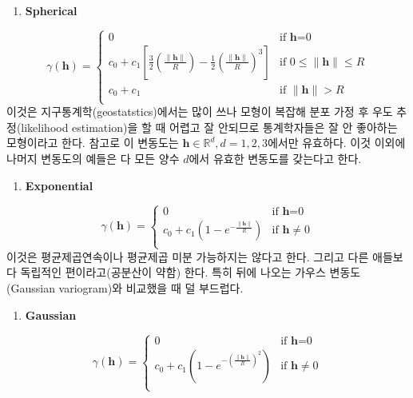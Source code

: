 \documentclass[b5paper,]{scrbook}
\providecommand{\tightlist}{%
  \setlength{\itemsep}{0pt}\setlength{\parskip}{0pt}}
\theoremstyle{plain}
\theoremstyle{definition}
\numberwithin{equation}{section}
\begin{document}
\begin{enumerate}
\def\labelenumi{\arabic{enumi}.}
\setcounter{enumi}{1}
\tightlist
\item
  \textbf{Spherical}
\end{enumerate}

\[
\gamma(\mathbf{h})= \left\{ \begin{array}{ll}
0 & \textrm{if $\mathbf{h}$=0}\\
c_{0}+c_{1}[\frac{3}{2}(\frac{\| \mathbf{h}\|}{R})-\frac{1}{2}(\frac{\| \mathbf{h}\|}{R})^{3}] & \textrm{if $0 \leq \|\mathbf{h}\|\leq R$}\\
c_{0}+c_{1} & \textrm{if $\|\mathbf{h}\|>R$}\\
\end{array} \right.
\] 이것은 지구통계학(geostatstics)에서는 많이 쓰나 모형이 복잡해 분포
가정 후 우도 추정(likelihood estimation)을 할 때 어렵고 잘 안되므로
통계학자들은 잘 안 좋아하는 모형이라고 한다. 참고로 이 변동도는
\(\mathbf{h} \in \mathbb{R}^{d}, d=1,2,3\)에서만 유효하다. 이것 이외에
나머지 변동도의 예들은 다 모든 양수 \(d\)에서 유효한 변동도를 갖는다고
한다.

\begin{enumerate}
\def\labelenumi{\arabic{enumi}.}
\setcounter{enumi}{2}
\tightlist
\item
  \textbf{Exponential}
\end{enumerate}

\[
\gamma(\mathbf{h})= \left\{ \begin{array}{ll}
0 & \textrm{if $\mathbf{h}$=0}\\
c_{0}+c_{1}(1-e^{-\frac{\|\mathbf{h}\|}{R}}) & \textrm{if $\mathbf{h}\neq 0$}\\
\end{array} \right.
\] 이것은 평균제곱연속이나 평균제곱 미분 가능하지는 않다고 한다. 그리고
다른 애들보다 독립적인 편이라고(공분산이 약함) 한다. 특히 뒤에 나오는
가우스 변동도(Gaussian variogram)와 비교했을 때 덜 부드럽다.

\begin{enumerate}
\def\labelenumi{\arabic{enumi}.}
\setcounter{enumi}{3}
\tightlist
\item
  \textbf{Gaussian}
\end{enumerate}

\[
\gamma(\mathbf{h})= \left\{ \begin{array}{ll}
0 & \textrm{if $\mathbf{h}$=0}\\
c_{0}+c_{1}(1-e^{-(\frac{\|\mathbf{h}\|}{R})^{2}}) & \textrm{if $\mathbf{h}\neq 0$}\\
\end{array} \right.
\]
\end{document}
